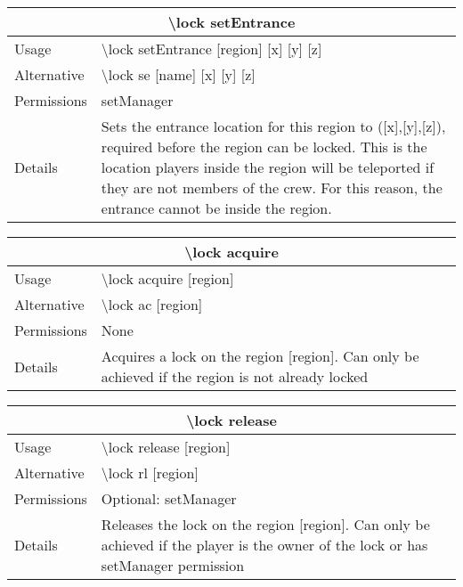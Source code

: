 \documentclass[a4paper,twoside,notitlepage,11pt]{article}
\begin{document}
\begin{center}
\begin{tabular}{|p{2cm}|p{12.5cm}|} \hline
\multicolumn{2}{|c|}{\textbf{\textbackslash lock setEntrance}} \\ \hline
Usage       & \textbackslash lock setEntrance [region] [x] [y] [z]\\ \hline
Alternative & \textbackslash lock se [name] [x] [y] [z]\\ \hline
Permissions & setManager \\ \hline
Details 	& Sets the entrance location for this region to ([x],[y],[z]), required before the region can be locked. This is the location players inside the region will be teleported if they are not members of the crew. For this reason, the entrance cannot be inside the region.\\ \hline
\end{tabular}
\end{center}

\begin{center}
\begin{tabular}{|p{2cm}|p{12.5cm}|} \hline
\multicolumn{2}{|c|}{\textbf{\textbackslash lock acquire}} \\ \hline
Usage       & \textbackslash lock acquire [region] \\ \hline
Alternative & \textbackslash lock ac [region] \\ \hline
Permissions & None \\ \hline
Details 	& Acquires a lock on the region [region]. Can only be achieved if the region is not already locked \\ \hline
\end{tabular}
\end{center}

\newpage
\pagestyle{plain}
\begin{center}
\begin{tabular}{|p{2cm}|p{12.5cm}|} \hline
\multicolumn{2}{|c|}{\textbf{\textbackslash lock release}} \\ \hline
Usage       & \textbackslash lock release [region] \\ \hline
Alternative & \textbackslash lock rl [region] \\ \hline
Permissions & Optional: setManager \\ \hline
Details 	& Releases the lock on the region [region]. Can only be achieved if the player is the owner of the lock or has setManager permission \\ \hline
\end{tabular}
\end{center}
\end{document}
